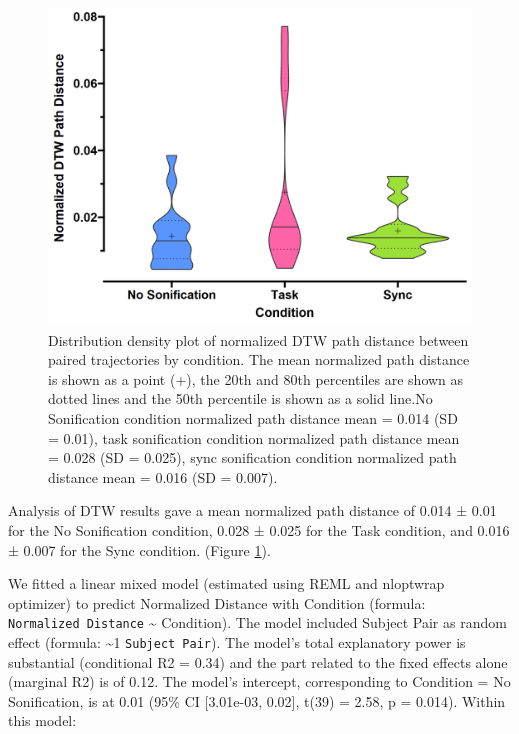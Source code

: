 \documentclass[10pt,a4paper,onecolumn]{article}
\begin{document}
\begin{figure}[h]

{\centering \includegraphics[width=1\linewidth]{figures/dtw_summary} 

}

\caption{Distribution density plot of normalized DTW path distance between paired trajectories by condition. The mean normalized path distance is shown as a point (+), the 20th and 80th percentiles are shown as dotted lines and the 50th percentile is shown as a solid line.No Sonification condition normalized path distance mean  = 0.014 (SD = 0.01), task sonification condition normalized path distance mean = 0.028 (SD = 0.025), sync sonification condition normalized path distance mean = 0.016 (SD = 0.007).}\label{fig:dtw-plot}
\end{figure}

Analysis of DTW results gave a mean normalized path distance of 0.014 ± 0.01 for the No Sonification condition,
0.028 ± 0.025 for the Task condition, and
0.016 ± 0.007 for the Sync condition. (Figure \ref{fig:dtw-plot}).

We fitted a linear mixed model (estimated using REML and nloptwrap optimizer) to predict Normalized Distance with Condition (formula: \texttt{Normalized\ Distance} \textasciitilde{} Condition). The model included Subject Pair as random effect (formula: \textasciitilde1 \textbar{} \texttt{Subject\ Pair}). The model's total explanatory power is substantial (conditional R2 = 0.34) and the part related to the fixed effects alone (marginal R2) is of 0.12. The model's intercept, corresponding to Condition = No Sonification, is at 0.01 (95\% CI {[}3.01e-03, 0.02{]}, t(39) = 2.58, p = 0.014). Within this model:
\end{document}
